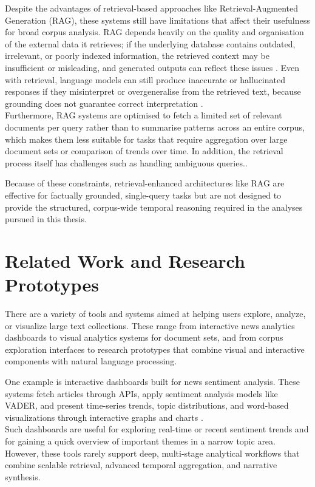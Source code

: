 Despite the advantages of retrieval-based approaches like Retrieval-Augmented Generation (RAG), these systems still have limitations that affect their usefulness for broad corpus analysis. RAG depends heavily on the quality and organisation of the external data it retrieves; if the underlying database contains outdated, irrelevant, or poorly indexed information, the retrieved context may be insufficient or misleading, and generated outputs can reflect these issues \cite{blog_rag_vs_buzz}. Even with retrieval, language models can still produce inaccurate or hallucinated responses if they misinterpret or overgeneralise from the retrieved text, because grounding does not guarantee correct interpretation \cite{rag_wikipedia}. \\
Furthermore, RAG systems are optimised to fetch a limited set of relevant documents per query rather than to summarise patterns across an entire corpus, which makes them less suitable for tasks that require aggregation over large document sets or comparison of trends over time. In addition, the retrieval process itself has challenges such as handling ambiguous queries.\cite{rag_problems_ibm}.

Because of these constraints, retrieval-enhanced architectures like RAG are effective for factually grounded, single-query tasks but are not designed to provide the structured, corpus-wide temporal reasoning required in the analyses pursued in this thesis.


\section{Related Work and Research Prototypes}

There are a variety of tools and systems aimed at helping users explore, analyze, or visualize large text collections. These range from interactive news analytics dashboards to visual analytics systems for document sets, and from corpus exploration interfaces to research prototypes that combine visual and interactive components with natural language processing.

One example is interactive dashboards built for news sentiment analysis. These systems fetch articles through APIs, apply sentiment analysis models like VADER, and present time-series trends, topic distributions, and word-based visualizations through interactive graphs and charts \cite{sentiment_dashboard_ijcrt}. \\
Such dashboards are useful for exploring real-time or recent sentiment trends and for gaining a quick overview of important themes in a narrow topic area. However, these tools rarely support deep, multi-stage analytical workflows that combine scalable retrieval, advanced temporal aggregation, and narrative synthesis.

